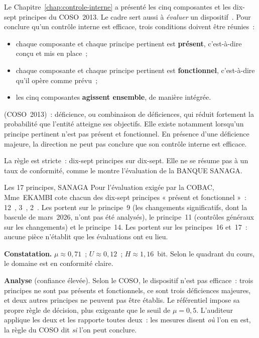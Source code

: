 Le Chapitre~\ref{chap:controle-interne} a présenté les cinq composantes et
les dix-sept principes du COSO~2013. Le cadre sert aussi à \emph{évaluer}
un dispositif~\cite{coso2013ic}. Pour conclure qu'un contrôle interne est
efficace, trois conditions doivent être réunies~:
\begin{itemize}
    \item chaque composante et chaque principe pertinent est
          \textbf{présent}, c'est-à-dire conçu et mis en place~;
    \item chaque composante et chaque principe pertinent est
          \textbf{fonctionnel}, c'est-à-dire qu'il opère comme prévu~;
    \item les cinq composantes \textbf{agissent ensemble}, de manière
          intégrée.
\end{itemize}

\begin{boxdef}
 (COSO~2013)~:
déficience, ou combinaison de déficiences, qui réduit fortement la
probabilité que l'entité atteigne ses objectifs. Elle existe notamment
lorsqu'un principe pertinent n'est pas présent et fonctionnel. En présence
d'une déficience majeure, la direction ne peut pas conclure que son
contrôle interne est efficace.
\end{boxdef}

La règle est stricte~: dix-sept principes sur dix-sept. Elle ne se résume
pas à un taux de conformité, comme le montre l'évaluation de la BANQUE
SANAGA.

\begin{boxlecture}{Les 17 principes, SANAGA}
Pour l'évaluation exigée par la COBAC, Mme~EKAMBI cote chacun des dix-sept
principes « présent et fonctionnel »~: 12~\OUI{}, 3~\NON{}, 2~\NEK{}. Les
\NON{} portent sur le principe~9 (les changements significatifs, dont la
bascule de mars~2026, n'ont pas été analysés), le principe~11 (contrôles
généraux sur les changements) et le principe~14. Les \NEK{} portent sur les
principes~16 et~17~: aucune pièce n'établit que les évaluations ont eu lieu.

\medskip
\textbf{Constatation.} $\mu \approx 0{,}71$~; $U \approx 0{,}12$~;
$H \approx 1{,}16$~bit. Selon le quadrant du cours, le domaine est en
conformité claire.

\medskip
\textbf{Analyse} (confiance élevée). Selon le COSO, le dispositif n'est
pas efficace~: trois principes ne sont pas présents et fonctionnels, ce
sont trois déficiences majeures, et deux autres principes ne peuvent pas
être établis. Le référentiel impose sa propre règle de décision, plus
exigeante que le seuil de $\mu = 0{,}5$. L'auditeur applique les deux et
les rapporte toutes deux~: les mesures disent \emph{où} l'on en est, la
règle du COSO dit \emph{si} l'on peut conclure.

\medskip
\hfill{}
\end{boxlecture}

